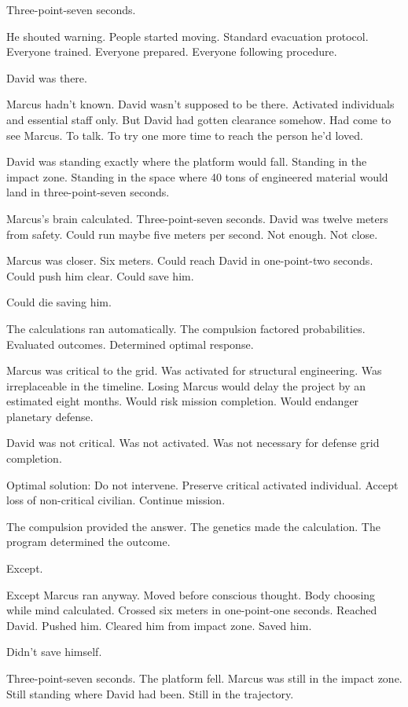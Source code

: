 Three-point-seven seconds.

He shouted warning. People started moving. Standard evacuation protocol. Everyone trained. Everyone prepared. Everyone following procedure.

David was there.

Marcus hadn't known. David wasn't supposed to be there. Activated individuals and essential staff only. But David had gotten clearance somehow. Had come to see Marcus. To talk. To try one more time to reach the person he'd loved.

David was standing exactly where the platform would fall. Standing in the impact zone. Standing in the space where 40 tons of engineered material would land in three-point-seven seconds.

Marcus's brain calculated. Three-point-seven seconds. David was twelve meters from safety. Could run maybe five meters per second. Not enough. Not close.

Marcus was closer. Six meters. Could reach David in one-point-two seconds. Could push him clear. Could save him.

Could die saving him.

The calculations ran automatically. The compulsion factored probabilities. Evaluated outcomes. Determined optimal response.

Marcus was critical to the grid. Was activated for structural engineering. Was irreplaceable in the timeline. Losing Marcus would delay the project by an estimated eight months. Would risk mission completion. Would endanger planetary defense.

David was not critical. Was not activated. Was not necessary for defense grid completion.

Optimal solution: Do not intervene. Preserve critical activated individual. Accept loss of non-critical civilian. Continue mission.

The compulsion provided the answer. The genetics made the calculation. The program determined the outcome.

Except.

Except Marcus ran anyway. Moved before conscious thought. Body choosing while mind calculated. Crossed six meters in one-point-one seconds. Reached David. Pushed him. Cleared him from impact zone. Saved him.

Didn't save himself.

Three-point-seven seconds. The platform fell. Marcus was still in the impact zone. Still standing where David had been. Still in the trajectory.

